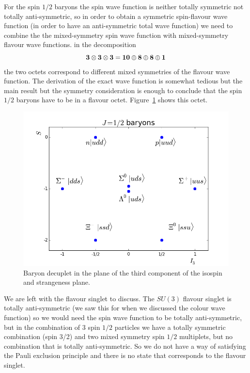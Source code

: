 \documentclass[12pt]{article}
\begin{document}
For the spin $1/2$ baryons the spin wave function is neither totally symmetric not totally anti-symmetric, so in order to obtain a symmetric spin-flavour wave function (in order to have an anti-symmetric total wave function) we need to combine the the mixed-symmetry spin wave function with mixed-symmetry flavour wave functions. in the decomposition 
\[\bf 3\otimes 3 \otimes 3 = 10\oplus 8 \oplus 8\oplus 1\] 
the two octets correspond to different mixed symmetries of the flavour wave function. The derivation of the exact wave function is somewhat tedious but the main result but the symmetry consideration is enough to conclude that the spin $1/2$ baryons have to be in a flavour octet. Figure~\ref{fig:baryonOctet} shows this octet. 
\begin{figure}[h]
\begin{center}
\includegraphics[scale=0.5]{images/BaryonOctet.png}
\end{center}
\caption{Baryon decuplet in the plane of the third component of the isospin and strangeness plane.}\label{fig:baryonOctet}
\end{figure}
We are left with the flavour singlet to discuss. The $SU(3)$ flavour singlet is totally anti-symmetric (we saw this for when we discussed the colour wave function) so we would need the spin wave function to be totally anti-symmetric, but in the combination of 3 spin $1/2$ particles we have a totally symmetric combination (spin 3/2) and two mixed symmetry spin $1/2$ multiplets, but no combination that is totally anti-symmetric. So we do not have a way of satisfying the Pauli exclusion principle and there is no state that corresponds to the flavour singlet.
\end{document}
